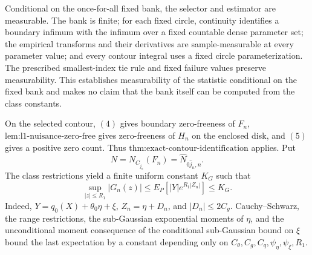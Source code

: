 Conditional on the once-for-all fixed bank, the selector and estimator are measurable.  The bank is finite; for each fixed circle, continuity identifies a boundary infimum with the infimum over a fixed countable dense parameter set; the empirical transforms and their derivatives are sample-measurable at every parameter value; and every contour integral uses a fixed circle parameterization.  The prescribed smallest-index tie rule and fixed failure values preserve measurability.  This establishes measurability of the statistic conditional on the fixed bank and makes no claim that the bank itself can be computed from the class constants.

On the selected contour, \((4)\) gives boundary zero-freeness of \(F_n\), \(\text{lem:l1-nuisance-zero-free}\) gives zero-freeness of \(H_n\) on the enclosed disk, and \((5)\) gives a positive zero count.  Thus \(\text{thm:exact-contour-identification}\) applies.  Put
\[
 N=N_{C_{\widehat j_n}}(F_n)
  =\widehat N_{0\widehat j_n,n}.
\]
The class restrictions yield a finite uniform constant \(K_G\) such that
\[
 \sup_{|z|\le R_1}|G_n(z)|
 \le E_P[|Y|e^{R_1|Z_n|}]
 \le K_G. \tag{7}
\]
Indeed, \(Y=q_0(X)+\theta_0\eta+\xi\), \(Z_n=\eta+D_n\), and \(|D_n|\le2C_g\).  Cauchy--Schwarz, the range restrictions, the sub-Gaussian exponential moments of \(\eta\), and the unconditional moment consequence of the conditional sub-Gaussian bound on \(\xi\) bound the last expectation by a constant depending only on \(C_{\theta},C_g,C_q,\psi_{\eta},\psi_{\xi},R_1\).

